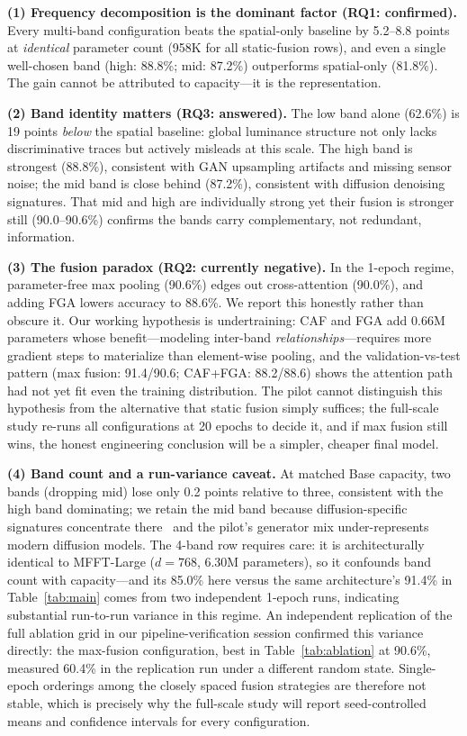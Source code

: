 \documentclass[journal]{IEEEtran}
\begin{document}
\textbf{(1) Frequency decomposition is the dominant factor (RQ1: confirmed).} Every multi-band configuration beats the spatial-only baseline by 5.2--8.8 points at \emph{identical} parameter count (958K for all static-fusion rows), and even a single well-chosen band (high: 88.8\%; mid: 87.2\%) outperforms spatial-only (81.8\%). The gain cannot be attributed to capacity---it is the representation.

\textbf{(2) Band identity matters (RQ3: answered).} The low band alone (62.6\%) is 19 points \emph{below} the spatial baseline: global luminance structure not only lacks discriminative traces but actively misleads at this scale. The high band is strongest (88.8\%), consistent with GAN upsampling artifacts and missing sensor noise; the mid band is close behind (87.2\%), consistent with diffusion denoising signatures. That mid and high are individually strong yet their fusion is stronger still (90.0--90.6\%) confirms the bands carry complementary, not redundant, information.

\textbf{(3) The fusion paradox (RQ2: currently negative).} In the 1-epoch regime, parameter-free max pooling (90.6\%) edges out cross-attention (90.0\%), and adding FGA lowers accuracy to 88.6\%. We report this honestly rather than obscure it. Our working hypothesis is undertraining: CAF and FGA add 0.66M parameters whose benefit---modeling inter-band \emph{relationships}---requires more gradient steps to materialize than element-wise pooling, and the validation-vs-test pattern (max fusion: 91.4/90.6; CAF+FGA: 88.2/88.6) shows the attention path had not yet fit even the training distribution. The pilot cannot distinguish this hypothesis from the alternative that static fusion simply suffices; the full-scale study re-runs all configurations at 20 epochs to decide it, and if max fusion still wins, the honest engineering conclusion will be a simpler, cheaper final model.

\textbf{(4) Band count and a run-variance caveat.} At matched Base capacity, two bands (dropping mid) lose only 0.2 points relative to three, consistent with the high band dominating; we retain the mid band because diffusion-specific signatures concentrate there~\cite{corvi2023} and the pilot's generator mix under-represents modern diffusion models. The 4-band row requires care: it is architecturally identical to MFFT-Large ($d{=}768$, 6.30M parameters), so it confounds band count with capacity---and its 85.0\% here versus the same architecture's 91.4\% in Table~\ref{tab:main} comes from two independent 1-epoch runs, indicating substantial run-to-run variance in this regime. An independent replication of the full ablation grid in our pipeline-verification session confirmed this variance directly: the max-fusion configuration, best in Table~\ref{tab:ablation} at 90.6\%, measured 60.4\% in the replication run under a different random state. Single-epoch orderings among the closely spaced fusion strategies are therefore not stable, which is precisely why the full-scale study will report seed-controlled means and confidence intervals for every configuration.
\end{document}
